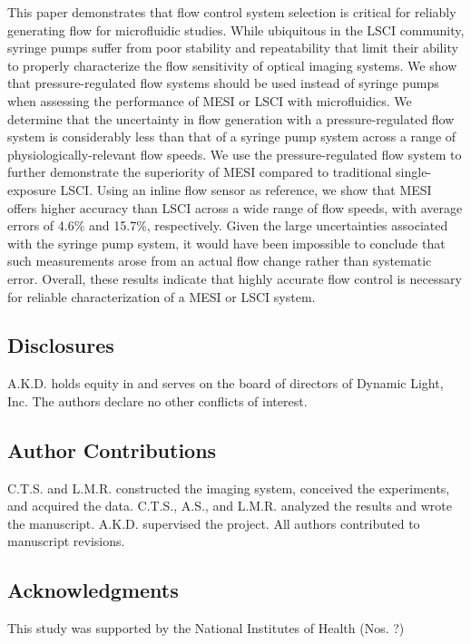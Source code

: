 \documentclass[12pt]{spieman}
\begin{document}
\begin{spacing}{2}
This paper demonstrates that flow control system selection is critical for reliably generating flow for microfluidic studies. While ubiquitous in the LSCI community, syringe pumps suffer from poor stability and repeatability that limit their ability to properly characterize the flow sensitivity of optical imaging systems. We show that pressure-regulated flow systems should be used instead of syringe pumps when assessing the performance of MESI or LSCI with microfluidics. We determine that the uncertainty in flow generation with a pressure-regulated flow system is considerably less than that of a syringe pump system across a range of physiologically-relevant flow speeds. We use the pressure-regulated flow system to further demonstrate the superiority of MESI compared to traditional single-exposure LSCI. Using an inline flow sensor as reference, we show that MESI offers higher accuracy than LSCI across a wide range of flow speeds, with average errors of 4.6\% and 15.7\%, respectively. Given the large uncertainties associated with the syringe pump system, it would have been impossible to conclude that such measurements arose from an actual flow change rather than systematic error. Overall, these results indicate that highly accurate flow control is necessary for reliable characterization of a MESI or LSCI system.


\subsection*{Disclosures}
A.K.D. holds equity in and serves on the board of directors of Dynamic Light, Inc. The authors declare no other conflicts of interest.

\subsection*{Author Contributions}
C.T.S. and L.M.R. constructed the imaging system, conceived the experiments, and acquired the data. C.T.S., A.S., and L.M.R. analyzed the results and wrote the manuscript. A.K.D. supervised the project. All authors contributed to manuscript revisions.

\subsection*{Acknowledgments}
This study was supported by the National Institutes of Health (Nos. ?)


\end{spacing}
\end{document}

